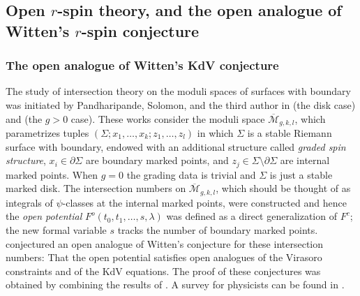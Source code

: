 \documentclass[11pt]{amsart}
\theoremstyle{definition}
\theoremstyle{remark}
\newcommand{\<}{\left<}
\renewcommand{\>}{\right>}
\numberwithin{equation}{section}
\def\Mbar{{\overline{\mathcal M}}}
\begin{document}
\subsection{Open $r$-spin theory, and the open analogue of Witten's $r$-spin conjecture}
\subsubsection{The open analogue of Witten's KdV conjecture}
The study of intersection theory on the moduli spaces of surfaces with boundary was initiated by Pandharipande, Solomon, and the third author in \cite{PST14} (the disk case) and \cite{ST1,Tes15} (the $g>0$ case).  These works consider the moduli space $\Mbar_{g,k,l}$, which parametrizes tuples $(\Sigma; x_1, \ldots, x_k; z_1, \ldots, z_l)$ in which $\Sigma$ is a stable Riemann surface with boundary, endowed with an additional structure called \emph{graded spin structure}, $x_i \in \partial\Sigma$ are boundary marked points, and $z_j \in \Sigma \setminus \partial\Sigma$ are internal marked points. When $g=0$ the grading data is trivial and $\Sigma$ is just a stable marked disk. The intersection numbers on $\Mbar_{g,k,l}$, which should be thought of as integrals of $\psi$-classes at the internal marked points, were constructed and hence the \emph{open potential} $F^o(t_0,t_1,\ldots,s,\lambda)$ was defined as a direct generalization of $F^c$; the new formal variable $s$ tracks the number of boundary marked points. \cite{PST14} conjectured an open analogue of Witten's conjecture for these intersection %
numbers: That the open %
potential satisfies open analogues of the Virasoro constraints and of the KdV equations. The proof of these conjectures was obtained by combining the results of \cite{Bur16,Tes15,BT17}. A survey for physicists can be found in \cite{DijkWit}.
\end{document}
